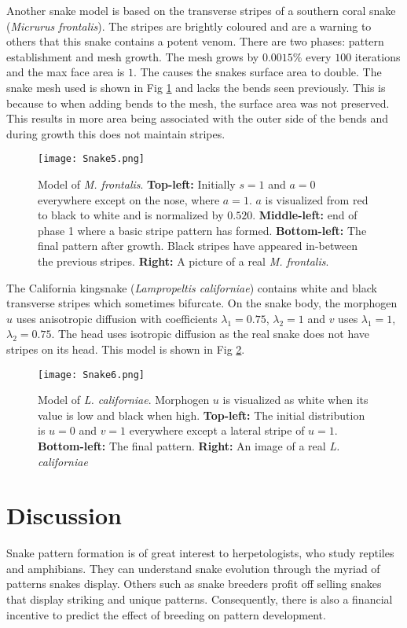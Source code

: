 Another snake model is based on the transverse stripes of a southern coral snake (\textit{Micrurus frontalis}). The stripes are brightly coloured and are a warning to others that this snake contains a potent venom. There are two phases: pattern establishment and mesh growth. The mesh grows by $0.0015\%$ every $100$ iterations and the max face area is $1$. The causes the snakes surface area to double. The snake mesh used is shown in Fig \ref{fig:Snake5} and lacks the bends seen previously. This is because to when adding bends to the mesh, the surface area was not preserved. This results in more area being associated with the outer side of the bends and during growth this does not maintain stripes.

\begin{figure}[ht]
	\centering
	\texttt{[image: Snake5.png]}
	\caption{Model of \textit{M. frontalis}. \textbf{Top-left:} Initially $s=1$ and $a=0$ everywhere except on the nose, where $a=1$. $a$ is visualized from red to black to white and is normalized by $0.520$. \textbf{Middle-left:} end of phase 1 where a basic stripe pattern has formed. \textbf{Bottom-left:} The final pattern after growth. Black stripes have appeared in-between the previous stripes. \textbf{Right:} A picture of a real \textit{M. frontalis}.}
	\label{fig:Snake5}
\end{figure}

\newpage 

The California kingsnake (\textit{Lampropeltis californiae}) contains white and black transverse stripes which sometimes bifurcate. On the snake body, the morphogen $u$ uses  anisotropic diffusion with coefficients $\lambda_{1}=0.75$, $\lambda_{2}=1$ and $v$ uses $\lambda_{1}=1$, $\lambda_{2}=0.75$. The head uses isotropic diffusion as the real snake does not have stripes on its head. This model is shown in Fig \ref{fig:Snake6}.

\begin{figure}[h]
	\centering
	\texttt{[image: Snake6.png]}
	\caption{Model of \textit{L. californiae}. Morphogen $u$ is visualized as white when its value is low and black when high. \textbf{Top-left:} The initial distribution is $u=0$ and $v=1$ everywhere except a lateral stripe  of $u=1$. \textbf{Bottom-left:} The final pattern. \textbf{Right:} An image of a real \textit{L. californiae}}
	\label{fig:Snake6}
\end{figure}

\newpage

\section{Discussion}
Snake pattern formation is of great interest to herpetologists, who study reptiles and amphibians. They can understand snake evolution through the myriad of patterns snakes display. Others such as snake breeders profit off selling snakes that display striking and unique patterns. Consequently, there is also a financial incentive to predict the effect of breeding on pattern development. 

